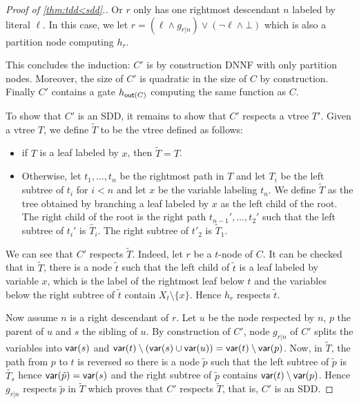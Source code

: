 \documentclass[a4paper,UKenglish,cleveref, autoref, thm-restate]{lipics-v2021}
\begin{document}
\begin{toappendix}
\begin{proof}[Proof of \cref{thm:tdd<sdd}.]
Or $r$ only has one rightmost descendant $n$ labeled by literal $\ell$. In this case, we let $r = (\ell \wedge g_{r|n}) \vee (\neg \ell \wedge \bot)$ which is also a partition node computing $h_r$. 



This concludes the induction: $C'$ is by construction DNNF with only partition nodes. Moreover, the size of $C'$ is quadratic in the size of $C$ by construction. Finally $C'$ contains a gate $h_{\out}$ computing the same function as $C$.

To show that $C'$ is an SDD, it remains to show that $C'$ respects a vtree $T'$. Given a vtree $T$, we define $\tilde{T}$ to be the vtree defined as follows:
\begin{itemize}
\item if $T$ is a leaf labeled by $x$, then $\tilde{T} = T$.
\item Otherwise, let $t_1, \dots, t_n$ be the rightmost path in $T$ and let $T_i$ be the left subtree of $t_i$ for $i<n$ and let $x$ be the variable labeling $t_n$. We define $\tilde T$ as the tree obtained by branching a leaf labeled by $x$ as the left child of the root. The right child of the root is the right path $t_{n-1}', \dots, t_{2}'$ such that the left subtree of $t_i'$ is $\tilde{T_i}$. The right subtree of $t'_{2}$ is $\tilde{T}_{1}$.
\end{itemize}

We can see that $C'$ respects $\tilde{T}$. 
%
Indeed, let $r$ be a $t$-node of $C$. It can be checked that in $\tilde{T}$, there is a node $\tilde{t}$ such that the left child of $\tilde{t}$ is a leaf labeled by variable $x$,  which is the label of the rightmost leaf below $t$ and the variables below the right subtree of $\tilde{t}$ contain $X_t \setminus \{x\}$. Hence $h_r$ respects $\tilde{t}$.

Now assume $n$ is a right descendant of $r$. Let $u$ be the node respected by $n$, $p$ the parent of $u$ and $s$ the sibling of $u$. By construction of $C'$, node $g_{r|n}$ of $C'$ splits the variables into $\mathsf{var}(s)$ and $\mathsf{var}(t) \setminus (\mathsf{var}(s) \cup \mathsf{var}(u)) = \mathsf{var}(t) \setminus \mathsf{var}(p)$. Now, in $\tilde{T}$, the path from $p$ to $t$ is reversed so there is a node $\tilde{p}$ such that the left subtree of $\tilde{p}$ is $\tilde{T_s}$ hence $\mathsf{var}(\tilde{p}) = \mathsf{var}(s)$ and the right subtree of $\tilde{p}$ contains $\mathsf{var}(t) \setminus \mathsf{var}(p)$. Hence $g_{r|n}$ respects $\tilde{p}$ in $\tilde{T}$ which proves that $C'$ respects $\tilde{T}$, that is, $C'$ is an SDD.


\end{proof}
\end{toappendix}
\end{document}
